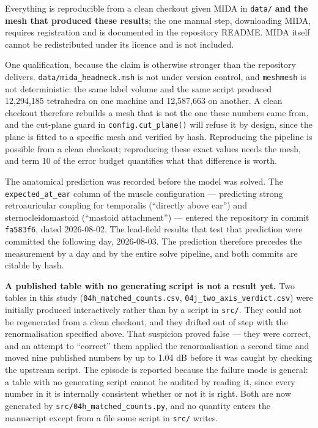 \documentclass[
  11pt,
  a4paper,
]{article}
\begin{document}
Everything is reproducible from a clean checkout given MIDA in \texttt{data/} \textbf{and the mesh that produced these results}; the one
manual step, downloading MIDA, requires registration and is documented in the
repository README. MIDA itself cannot be redistributed under its licence and is
not included.

One qualification, because the claim is otherwise stronger than the repository
delivers. \texttt{data/mida\_headneck.msh} is not under version control, and \texttt{meshmesh}
is not deterministic: the same label volume and the same script produced
12,294,185 tetrahedra on one machine and 12,587,663 on another. A clean checkout
therefore rebuilds a mesh that is not the one these numbers came from, and the
cut-plane guard in \texttt{config.cut\_plane()} will refuse it by design, since the
plane is fitted to a specific mesh and verified by hash. Reproducing the
pipeline is possible from a clean checkout; reproducing these exact values needs
the mesh, and term 10 of the error budget quantifies what that difference is
worth.

The anatomical prediction was recorded before the model was solved. The
\texttt{expected\_at\_ear} column of the muscle configuration --- predicting strong
retroauricular coupling for temporalis (``directly above ear'') and
sternocleidomastoid (``mastoid attachment'') --- entered the repository in commit
\texttt{fa583f6}, dated 2026-08-02. The lead-field results that test that prediction
were committed the following day, 2026-08-03. The prediction therefore precedes
the measurement by a day and by the entire solve pipeline, and both commits are
citable by hash.

\textbf{A published table with no generating script is not a result yet.} Two tables
in this study (\texttt{04h\_matched\_counts.csv}, \texttt{04j\_two\_axis\_verdict.csv}) were
initially produced interactively rather than by a script in \texttt{src/}. They could
not be regenerated from a clean checkout, and they drifted out of step with the
renormalisation specified above. That suspicion proved false --- they were
correct, and an attempt to ``correct'' them applied the renormalisation a second
time and moved nine published numbers by up to 1.04 dB before it was caught by
checking the upstream script. The episode is reported because the failure mode
is general: a table with no generating script cannot be audited by reading it,
since every number in it is internally consistent whether or not it is right.
Both are now generated by \texttt{src/04h\_matched\_counts.py}, and no quantity enters
the manuscript except from a file some script in \texttt{src/} writes.
\end{document}
